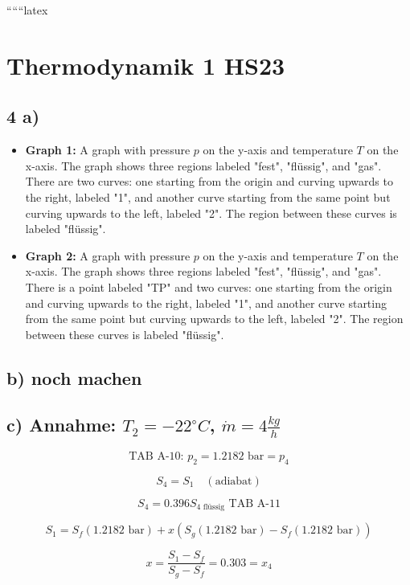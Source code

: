 
``````latex


\section*{Thermodynamik 1 HS23}

\subsection*{4 a)}

\begin{itemize}
    \item \textbf{Graph 1:} A graph with pressure \( p \) on the y-axis and temperature \( T \) on the x-axis. The graph shows three regions labeled "fest", "flüssig", and "gas". There are two curves: one starting from the origin and curving upwards to the right, labeled "1", and another curve starting from the same point but curving upwards to the left, labeled "2". The region between these curves is labeled "flüssig".
    \item \textbf{Graph 2:} A graph with pressure \( p \) on the y-axis and temperature \( T \) on the x-axis. The graph shows three regions labeled "fest", "flüssig", and "gas". There is a point labeled "TP" and two curves: one starting from the origin and curving upwards to the right, labeled "1", and another curve starting from the same point but curving upwards to the left, labeled "2". The region between these curves is labeled "flüssig".
\end{itemize}

\subsection*{b) noch machen}

\subsection*{c) Annahme: \( T_2 = -22^\circ C \), \( \dot{m} = 4 \frac{kg}{h} \)}

\[
\text{TAB A-10: } p_2 = 1.2182 \text{ bar} = p_4
\]

\[
S_4 = S_1 \quad (\text{adiabat})
\]

\[
S_4 = 0.396 S_{4 \text{ flüssig}} \text{ TAB A-11}
\]

\[
S_1 = S_f (1.2182 \text{ bar}) + x (S_g (1.2182 \text{ bar}) - S_f (1.2182 \text{ bar}))
\]

\[
x = \frac{S_1 - S_f}{S_g - S_f} = 0.303 = x_4
\]


